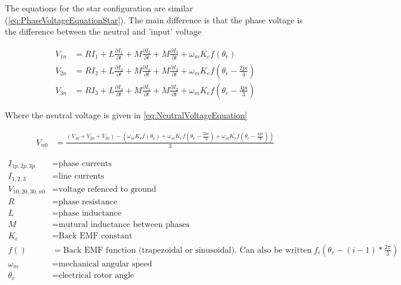 \documentclass[]{report}
\begin{document}
The equations for the star configuration are similar (\autoref{eq:PhaseVoltageEquationStar}). The main difference is that the phase voltage is the difference between the neutral and 'input' voltage

\begin{equation} \label{eq:PhaseVoltageEquationStar}
	\begin{split}
		V_{1n} &= RI_{1} + L\frac{\partial I_{1}}{\partial t} + M\frac{\partial I_{2}}{\partial t} + M\frac{\partial I_{3}}{\partial t} + \omega_m K_e f\left(\theta_e\right) \\
		V_{2n} &= RI_{2} + L\frac{\partial I_{2}}{\partial t} + M\frac{\partial I_{1}}{\partial t} + M\frac{\partial I_{3}}{\partial t} + \omega_m K_e f\left(\theta_e - \frac{2pi}{3}\right) \\
		V_{3n} &= RI_{3} + L\frac{\partial I_{3}}{\partial t} + M\frac{\partial I_{1}}{\partial t} + M\frac{\partial I_{2}}{\partial t} + \omega_m K_e f\left(\theta_e - \frac{4pi}{3}\right)
	\end{split}
\end{equation}

Where the neutral voltage is given in \autoref{eq:NeutralVoltageEquation}

\begin{equation} \label{eq:NeutralVoltageEquation}
	\begin{split}
		V_{n0} &= \frac{\left(V_{10} + V_{20} + V_{30} \right) - \left(\omega_m K_e f\left(\theta_e\right) + \omega_m K_e f\left(\theta_e - \frac{2pi}{3}\right) + \omega_m K_e f\left(\theta_e - \frac{4pi}{3}\right) \right)}{3}
	\end{split}
\end{equation}

\begin{equation*}
	\begin{split}
		I_{1p, 2p, 3p} &= \text{phase currents} \\
		I_{1, 2, 3} &= \text{line currents} \\
		V_{10, 20, 30, n0} &= \text{voltage refenced to ground} \\
		R &= \text{phase resistance} \\
		L &= \text{phase inductance} \\
		M &= \text{mutural inductance between phases} \\
		K_e &= \text{Back EMF constant} \\
		f() &= \text{Back EMF function (trapezoidal or sinusoidal). Can also be written as: } f_i\left(\theta_e - (i - 1)*\frac{2\pi}{3}\right) \\
		\omega_m &= \text{mechanical angular speed} \\
		\theta_e &= \text{electrical rotor angle}
	\end{split}
\end{equation*}
\end{document}
